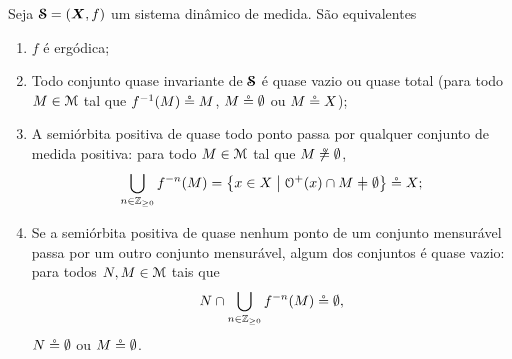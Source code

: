 \begin{proposition}
Seja $\bm{\mathcal{S}}=(\bm X,f)$ um sistema dinâmico de medida. São equivalentes
	\begin{enumerate}
	\item $f$ é ergódica;
	\item Todo conjunto quase invariante de $\bm{\mathcal{S}}$ é quase vazio ou quase total (para todo $M \in \mathcal{M}$ tal que $f^{-1}(M) \circeq M$, $M \circeq \emptyset$ ou $M \circeq X$);
	\item A semiórbita positiva de quase todo ponto passa por qualquer conjunto de medida positiva: para todo $M \in \mathcal{M}$ tal que $M \not\circeq \emptyset$,
		\begin{equation*}
		\bigcup_{n \in \Z_{\geq 0}} f^{-n}(M) = \set{x \in X}{\Orb^+(x) \cap M \neq \emptyset} \qeq X;
		\end{equation*}
	\item Se a semiórbita positiva de quase nenhum ponto de um conjunto mensurável passa por um outro conjunto mensurável, algum dos conjuntos é quase vazio: para todos $N,M \in \mathcal{M}$ tais que
	\begin{equation*}
	N \cap \bigcup_{n \in \mathbb{Z}_{\geq 0}}f^{-n}(M) \circeq \emptyset,
	\end{equation*}
$N \circeq \emptyset$ ou $M \circeq \emptyset$.
	\end{enumerate}
\end{proposition}

